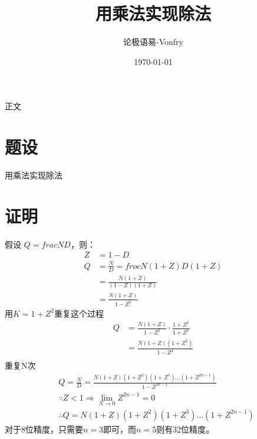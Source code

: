 \documentclass{article}
\title{用乘法实现除法}
\author{论极语易-Vonfry}
\date{\today}
\begin{document}
\maketitle

 正文
\section{题设}
用乘法实现除法

\section{证明}

\noindent
假设 $ Q = frac{N}{D} $，则：
\begin{align*}
    Z &= 1 - D \\
    Q &= \frac{N}{D} = froc{N(1+Z)}{D(1+Z)} \\
    &= \frac{N(1+Z)}{(1-Z)(1+Z)} \\
    &= \frac{N(1+Z)}{1-Z^2}
\end{align*}
用$K = 1+Z^2$重复这个过程
\begin{align*}
    Q &= \frac{N(1+Z)}{1-Z^2} \cdot \frac{1+Z^2}{1+Z^2} \\
    &= \frac{N(1+Z)(1+Z^2)}{1-Z^4} \\
\end{align*}
重复N次
\begin{align*}
    & Q = \frac{N}{D} = \frac{N(1+Z)(1+Z^2)(1+Z^3)\dots (1+Z^{2n-1})}{1-Z^{2n-1}} \\
    & \because Z < 1 \Rightarrow  \lim_{N\to 0}Z^{2n-1}=0\\
    & \therefore Q = N(1+Z)(1+Z^2)(1+Z^3)\dots (1+Z^{2n-1})
\end{align*}
对于8位精度，只需要$n=3$即可，而$n=5$则有32位精度。
\end{document}
